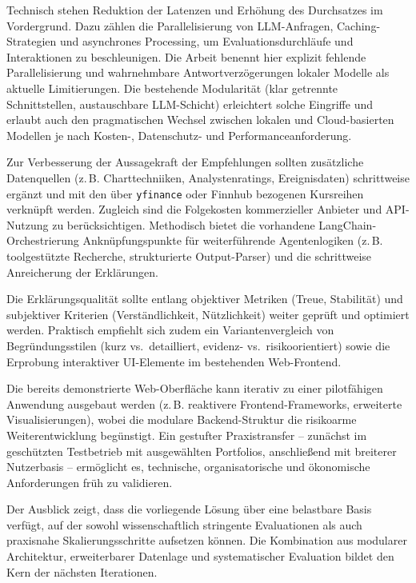     Technisch stehen Reduktion der Latenzen und Erhöhung des Durchsatzes im Vordergrund.
    Dazu zählen die Parallelisierung von \acs{LLM}-Anfragen, Caching-Strategien und asynchrones Processing, um Evaluationsdurchläufe und Interaktionen zu beschleunigen.
    Die Arbeit benennt hier explizit fehlende Parallelisierung und wahrnehmbare Antwortverzögerungen lokaler Modelle als aktuelle Limitierungen.
    Die bestehende Modularität (klar getrennte Schnittstellen, austauschbare \acs{LLM}-Schicht) erleichtert solche Eingriffe und erlaubt auch den pragmatischen Wechsel zwischen lokalen und Cloud-basierten Modellen je nach Kosten-, Datenschutz- und Performanceanforderung.

    Zur Verbesserung der Aussagekraft der Empfehlungen sollten zusätzliche Datenquellen (z.\,B. Charttechniiken, Analystenratings, Ereignisdaten) schrittweise ergänzt und mit den über \texttt{yfinance} oder Finnhub bezogenen Kursreihen verknüpft werden.
    Zugleich sind die Folgekosten kommerzieller Anbieter und \acs{API}-Nutzung zu berücksichtigen.
    Methodisch bietet die vorhandene LangChain-Orchestrierung Anknüpfungspunkte für weiterführende Agentenlogiken (z.\,B. toolgestützte Recherche, strukturierte Output-Parser) und die schrittweise Anreicherung der Erklärungen.

    Die Erklärungsqualität sollte entlang objektiver Metriken (Treue, Stabilität) und subjektiver Kriterien (Verständlichkeit, Nützlichkeit) weiter geprüft und optimiert werden.
    Praktisch empfiehlt sich zudem ein Variantenvergleich von Begründungsstilen (kurz vs.\ detailliert, evidenz- vs.\ risikoorientiert) sowie die Erprobung interaktiver UI-Elemente im bestehenden Web-Frontend.

    Die bereits demonstrierte Web-Oberfläche kann iterativ zu einer pilotfähigen Anwendung ausgebaut werden (z.\,B. reaktivere Frontend-Frameworks, erweiterte Visualisierungen), wobei die modulare Backend-Struktur die risikoarme Weiterentwicklung begünstigt.
    Ein gestufter Praxistransfer -- zunächst im geschützten Testbetrieb mit ausgewählten Portfolios, anschließend mit breiterer Nutzerbasis -- ermöglicht es, technische, organisatorische und ökonomische Anforderungen früh zu validieren.

    Der Ausblick zeigt, dass die vorliegende Lösung über eine belastbare Basis verfügt, auf der sowohl wissenschaftlich stringente Evaluationen als auch praxisnahe Skalierungsschritte aufsetzen können.
    Die Kombination aus modularer Architektur, erweiterbarer Datenlage und systematischer Evaluation bildet den Kern der nächsten Iterationen.

